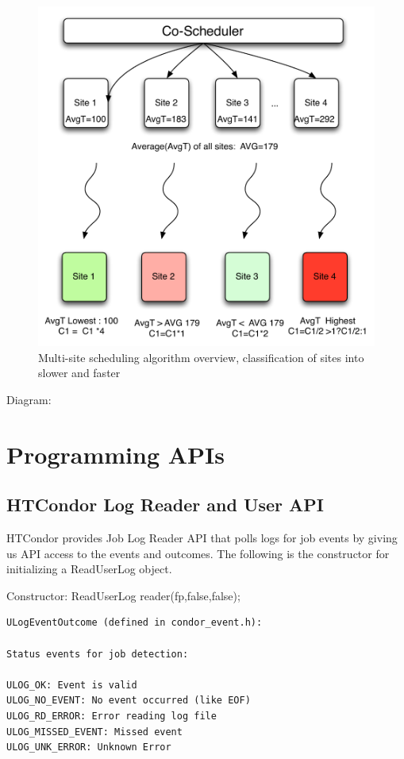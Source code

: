 \documentclass[ms,electronic,double]{nuthesis}
\begin{document}
\begin{figure}[htbp!]
\begin{center}
\includegraphics[scale=0.75]{images/multipleSites}
\caption{Multi-site scheduling algorithm overview, classification of sites into slower and faster}
\label{fig:multiSite1}
\end{center}
\end{figure}
\FloatBarrier
Diagram:
\section{Programming APIs}
\subsection{HTCondor Log Reader and User API}

HTCondor provides Job Log Reader API\cite{manual56} that polls logs for job events by giving us 
API access to the events and outcomes. The following is the constructor for 
initializing a ReadUserLog object.

Constructor:
ReadUserLog reader(fp,false,false);
\begin{verbatim}
ULogEventOutcome (defined in condor_event.h):

Status events for job detection:

ULOG_OK: Event is valid
ULOG_NO_EVENT: No event occurred (like EOF)
ULOG_RD_ERROR: Error reading log file
ULOG_MISSED_EVENT: Missed event
ULOG_UNK_ERROR: Unknown Error
\end{verbatim}
\end{document}
